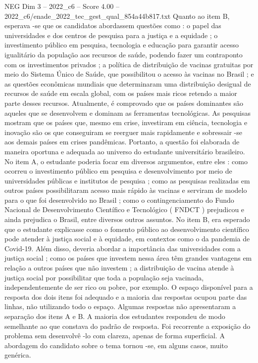 \begin{textsample}{NEG Dim 3 – 2022\_c6 – Score 4.00 – 2022\_c6/enade\_2022\_tec\_gest\_qual\_854a44b817.txt}
Quanto ao item B, esperava -se que os candidatos abordassem questões como : o papel das universidades e dos centros de pesquisa para a justiça e a equidade ; o investimento público em pesquisa, tecnologia e educação para garantir acesso igualitário da população aos recursos de saúde, podendo fazer um contraponto com os investimentos privados ; a política de distribuição de vacinas gratuitas por meio do Sistema Único de Saúde, que possibilitou o acesso às vacinas no Brasil ; e as questões econômicas mundiais que determinaram uma distribuição desigual de recursos de saúde em escala global, com os países mais ricos retendo a maior parte desses recursos.
Atualmente, é comprovado que os países dominantes são aqueles que se desenvolvem e dominam as ferramentas tecnológicas.
As pesquisas mostram que os países que, mesmo em crise, investiram em ciência, tecnologia e inovação são os que conseguiram se reerguer mais rapidamente e sobressair -se aos demais países em crises pandêmicas.
Portanto, a questão foi elaborada de maneira oportuna e adequada ao universo do estudante universitário brasileiro.
No item A, o estudante poderia focar em diversos argumentos, entre eles : como ocorreu o investimento público em pesquisa e desenvolvimento por meio de universidades públicas e institutos de pesquisa ; como as pesquisas realizadas em outros países possibilitaram acesso mais rápido às vacinas e serviram de modelo para o que foi desenvolvido no Brasil ; como o contingenciamento do Fundo Nacional de Desenvolvimento Científico e Tecnológico ( FNDCT ) prejudicou e ainda prejudica o Brasil, entre diversos outros assuntos.
No item B, era esperado que o estudante explicasse como o fomento público ao desenvolvimento científico pode atender à justiça social e à equidade, em contextos como o da pandemia de Covid-19.
Além disso, deveria abordar a importância das universidades com a justiça social ; como os países que investem nessa área têm grandes vantagens em relação a outros países que não investem ; a distribuição de vacina atende à justiça social por possibilitar que toda a população seja vacinada, independentemente de ser rico ou pobre, por exemplo.
O espaço disponível para a resposta dos dois itens foi adequado e a maioria das respostas ocupou parte das linhas, não utilizando todo o espaço.
Algumas respostas não apresentaram a separação dos itens A e B.
A maioria dos estudantes respondeu de modo semelhante ao que constava do padrão de resposta.
Foi recorrente a exposição do problema sem desenvolvê -lo com clareza, apenas de forma superficial.
A abordagem do candidato sobre o tema tornou -se, em alguns casos, muito genérica.

\end{textsample}
